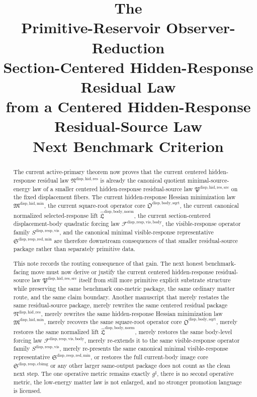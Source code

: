 \documentclass[11pt]{article}
\title{\textbf{The \TheoryName{}}\\[0.4em]
\large Primitive-Reservoir Observer-Reduction\\
\large Section-Centered Hidden-Response\\
\large Residual Law\\
\large from a Centered Hidden-Response\\
\large Residual-Source Law\\
\large Next Benchmark Criterion}
\author{}
\date{}
\newcommand{\CompletedMetric}{g^{\sharp}}
\newcommand{\ResidualSourceLawPackage}{\mathfrak P^{\mathrm{disp,hid,res,src}}}
\newcommand{\ResidualLawPackage}{\mathfrak N^{\mathrm{disp,hid,res}}}
\newcommand{\HiddenMinimizationPackage}{\mathfrak M^{\mathrm{disp,hid,min}}}
\newcommand{\SquareRootOperatorCore}{\mathfrak O^{\mathrm{disp,body,sqrt}}}
\newcommand{\NormalizedLiftPackage}{\widehat{\mathfrak L}^{\mathrm{disp,body,norm}}}
\newcommand{\VisibleBodyForcingLaw}{\mathscr F^{\mathrm{disp,resp,vis,body}}}
\newcommand{\VisibleResponseOperator}{S^{\mathrm{disp,resp,vis}}}
\newcommand{\MinimalReducedStructure}{\mathfrak S^{\mathrm{disp,resp,red,min}}}
\newcommand{\CurrentBodyImageCore}{\mathfrak S^{\mathrm{disp,resp,cbimg}}}
\begin{document}
\maketitle

\begin{abstract}
The current active-primary theorem now proves that the current centered hidden-response residual law \(\ResidualLawPackage\) is already the canonical quotient minimal-source-energy law of a smaller centered hidden-response residual-source law \(\ResidualSourceLawPackage\) on the fixed displacement fibers. The current hidden-response Hessian minimization law \(\HiddenMinimizationPackage\), the current square-root operator core \(\SquareRootOperatorCore\), the current canonical normalized selected-response lift \(\NormalizedLiftPackage\), the current section-centered displacement-body quadratic forcing law \(\VisibleBodyForcingLaw\), the visible-response operator family \(\VisibleResponseOperator\), and the canonical minimal visible-response representative \(\MinimalReducedStructure\) are therefore downstream consequences of that smaller residual-source package rather than separately primitive data.

This note records the routing consequence of that gain. The next honest benchmark-facing move must now derive or justify the current centered hidden-response residual-source law \(\ResidualSourceLawPackage\) itself from still more primitive explicit substrate structure while preserving the same benchmark one-metric package, the same ordinary matter route, and the same claim boundary. Another manuscript that merely restates the same residual-source package, merely rewrites the same centered residual package \(\ResidualLawPackage\), merely rewrites the same hidden-response Hessian minimization law \(\HiddenMinimizationPackage\), merely recovers the same square-root operator core \(\SquareRootOperatorCore\), merely restores the same normalized lift \(\NormalizedLiftPackage\), merely restores the same body-level forcing law \(\VisibleBodyForcingLaw\), merely re-extends it to the same visible-response operator family \(\VisibleResponseOperator\), merely re-presents the same canonical minimal visible-response representative \(\MinimalReducedStructure\), or restores the full current-body image core \(\CurrentBodyImageCore\) or any other larger same-output package does not count as the clean next step. The one operative metric remains exactly \(\CompletedMetric\), there is no second operative metric, the low-energy matter law is not enlarged, and no stronger promotion language is licensed.
\end{abstract}
\end{document}

